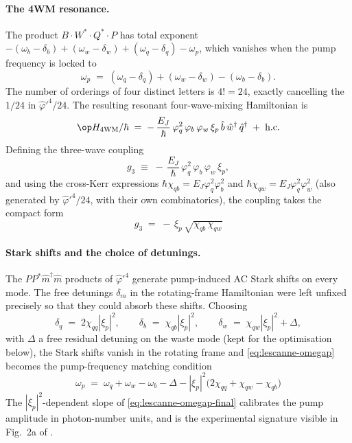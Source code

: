 \paragraph{The 4WM resonance.}
The product $B\cdot W^*\cdot Q^*\cdot P$ has total exponent
$-(\omega_b-\delta_b)+(\omega_w-\delta_w)+(\omega_q-\delta_q)-\omega_p$,
which vanishes when the pump frequency is locked to
\begin{equation}
\label{eq:lescanne-omegap}
\omega_p \;=\; (\omega_q-\delta_q)+(\omega_w-\delta_w)-(\omega_b-\delta_b).
\end{equation}
The number of orderings of four distinct letters is $4!=24$,
exactly cancelling the $1/24$ in $\hat\varphi'^4/24$. The resulting
resonant four-wave-mixing Hamiltonian is
\begin{equation}
\label{eq:lescanne-H4WM}
\op H_{\rm 4WM}/\hbar
\;=\; -\,\frac{E_J}{\hbar}\,\varphi_q^2\,\varphi_b\,\varphi_w\,\xi_p\,
\hat b\,\hat w^\dagger\,\hat q^\dagger
\;+\; \hbox{h.c.}
\end{equation}
Defining the three-wave coupling
\begin{equation}
\label{eq:lescanne-g3}
g_3 \;\equiv\; -\,\frac{E_J}{\hbar}\,\varphi_q^2\,\varphi_b\,\varphi_w\,\xi_p,
\end{equation}
and using the cross-Kerr expressions
$\hbar\chi_{qb}=E_J\varphi_q^2\varphi_b^2$ and
$\hbar\chi_{qw}=E_J\varphi_q^2\varphi_w^2$ (also generated by
$\hat\varphi'^4/24$, with their own combinatorics), the coupling
takes the compact form
\begin{equation}
\label{eq:lescanne-g3-chi}
\boxed{\;g_3 \;=\; -\,\xi_p\,\sqrt{\chi_{qb}\,\chi_{qw}}\;}
\end{equation}

\paragraph{Stark shifts and the choice of detunings.}
The $PP^*\hat m^\dagger\hat m$ products of $\hat\varphi'^4$ generate
pump-induced AC Stark shifts on every mode. The free detunings
$\delta_m$ in the rotating-frame Hamiltonian were left unfixed
precisely so that they could absorb these shifts. Choosing
\begin{equation}
\delta_q \;=\; 2\chi_{qq}|\xi_p|^2,\qquad
\delta_b \;=\; \chi_{qb}|\xi_p|^2,\qquad
\delta_w \;=\; \chi_{qw}|\xi_p|^2 + \Delta,
\end{equation}
with $\Delta$ a free residual detuning on the waste mode (kept for
the optimisation below), the Stark shifts vanish in the rotating
frame and \cref{eq:lescanne-omegap} becomes the pump-frequency
matching condition
\begin{equation}
\label{eq:lescanne-omegap-final}
\boxed{\;\omega_p \;=\; \omega_q+\omega_w-\omega_b - \Delta
- |\xi_p|^2\bigl(2\chi_{qq}+\chi_{qw}-\chi_{qb}\bigr)\;}
\end{equation}
The $|\xi_p|^2$-dependent slope of \cref{eq:lescanne-omegap-final}
calibrates the pump amplitude in photon-number units, and is the
experimental signature visible in Fig.~2a of \cite{lescanne2020}.

